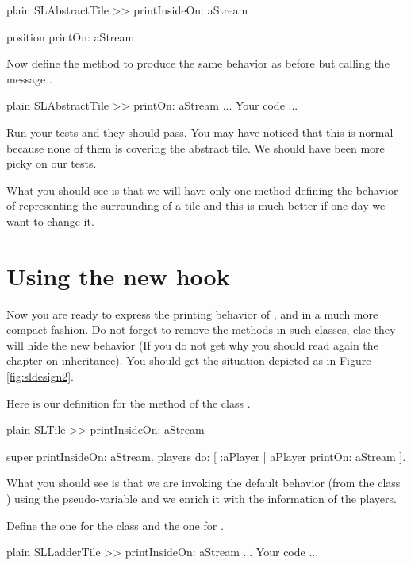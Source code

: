 \documentclass[10pt,twoside,english]{_support/latex/sbabook/sbabook}
\begin{document}
\begin{displaycode}{plain}
SLAbstractTile >> printInsideOn: aStream

	position printOn: aStream
\end{displaycode}

Now define the method  to produce the same behavior as before but calling the message . 

\begin{displaycode}{plain}
SLAbstractTile >> printOn: aStream
	... Your code ...
\end{displaycode}

Run your tests and they should pass. You may have noticed that this is normal because none of them is covering the abstract tile. We should have been more picky on our tests. 

What you should see is that we will have only one method defining the behavior of representing the surrounding of a tile and this is much better if one day we want to change it.
\section{Using the new hook}
Now you are ready to express the printing behavior of ,  and  in a much more compact fashion. Do not forget to remove the  methods in such classes, else they will hide the new behavior (If you do not get why you should read again the chapter on inheritance). You should get the situation depicted as in Figure \ref{fig:sldesign2}.

Here is our definition for the  method of the class . 

\begin{displaycode}{plain}
SLTile >> printInsideOn: aStream

	super printInsideOn: aStream.
	players do: [ :aPlayer | aPlayer printOn: aStream ].
\end{displaycode}

What you should see is that we are invoking the default behavior (from the class ) using the  pseudo-variable and we enrich it with the information of the players.

Define the one for the  class and the one for .

\begin{displaycode}{plain}
SLLadderTile >> printInsideOn: aStream
	... Your code ...
\end{displaycode}
\end{document}
